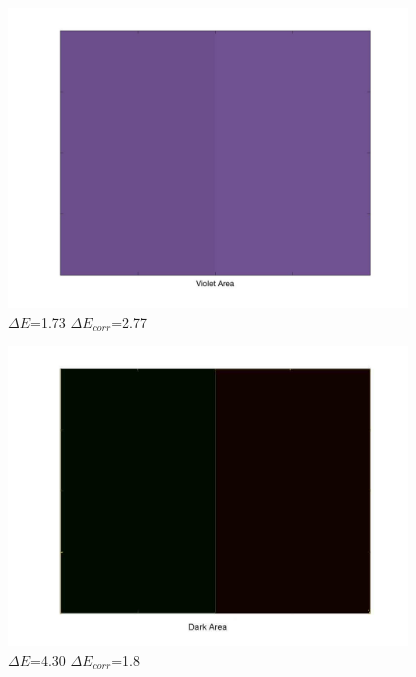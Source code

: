 \documentclass{article}
\begin{document}
\begin{figure}[!h]
	\center
 	\includegraphics[width=300pt]{./img/violet.jpg}
  	\caption{$\Delta E$=1.73  $\Delta E_{corr}$=2.77 }\label{fig:violet}
\end{figure}

\begin{figure}[!h]
	\center
 	\includegraphics[width=300pt]{./img/dark.jpg}
  	\caption{$\Delta E$=4.30  $\Delta E_{corr}$=1.8 }\label{fig:dark}
\end{figure}
\end{document}
